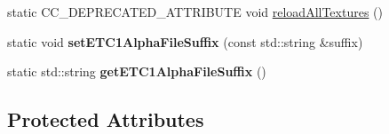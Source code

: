 \begin{DoxyCompactItemize}
\item 
static C\+C\+\_\+\+D\+E\+P\+R\+E\+C\+A\+T\+E\+D\+\_\+\+A\+T\+T\+R\+I\+B\+U\+TE void \hyperlink{classTextureCache_ac70068345cc5744cf0be99ad51615275}{reload\+All\+Textures} ()
\item 
\mbox{\label{classTextureCache_a2524f0fced01a316a4867aefb3ea5cf8}} 
static void {\bfseries set\+E\+T\+C1\+Alpha\+File\+Suffix} (const std\+::string \&suffix)
\item 
\mbox{\label{classTextureCache_a1ada8f4f153f490ccde00eb672b58610}} 
static std\+::string {\bfseries get\+E\+T\+C1\+Alpha\+File\+Suffix} ()
\end{DoxyCompactItemize}
\subsection*{Protected Attributes}
